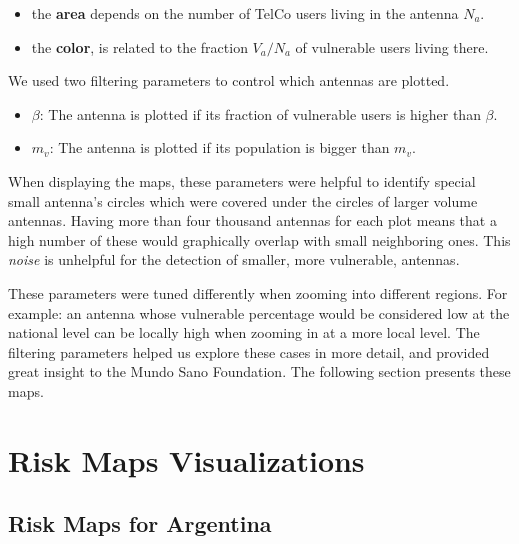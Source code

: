 \begin{itemize}
	\item the \textbf{area} depends on the number of TelCo users living in the antenna $N_a$.

	\item the \textbf{color}, is related to the fraction ${V_a}/{N_a}$ of vulnerable users living there.
\end{itemize}


We used two filtering parameters to control which antennas are plotted.
\begin{itemize}
	\item $\beta$: The antenna is plotted if its fraction of vulnerable users is higher than $\beta$.
	\item $m_v$: The antenna is plotted if its population is bigger than $m_v$.
\end{itemize}

When displaying the maps, these parameters were helpful to identify special small antenna's circles which were covered under the circles of larger volume antennas.
Having more than four thousand antennas for each plot means that a high number of these would graphically overlap with small neighboring ones.
This \textit{noise} is unhelpful for the detection of smaller, more vulnerable, antennas.

These parameters were tuned differently when zooming into different regions.
For example: an antenna whose vulnerable percentage would be considered low at the national level can be locally high when zooming in at a more local level.
The filtering parameters helped us explore these cases in more detail, and provided great insight to the Mundo Sano Foundation.
The following section presents these maps.

\section{Risk Maps Visualizations}\label{section:riskmaps}

\subsection{Risk Maps for Argentina}


